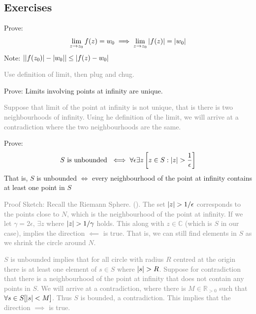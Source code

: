 \documentclass[12pt, english]{book}
\makeatletter
\renewenvironment{proof}[1][\proofname]{\par
	\pushQED{\qed}%
	\normalfont \topsep6\p@\@plus6\p@\relax
	\list{}{%
		\settowidth{\leftmargin}{\itshape\proofname:\hskip\labelsep}%
		\setlength{\labelwidth}{0pt}%
		\setlength{\itemindent}{-\leftmargin}%
		}%
	\item[\hskip\labelsep\itshape#1\@addpunct{:}]\ignorespaces
	}{\popQED\endlist\@endpefalse}
\makeatother
\begin{document}
	\subsection{Exercises}
	
	\begin{example}
		Prove: $$ \lim_{z \rightarrow z_0} f(z) = w_0 \implies \lim_{z \rightarrow z_0} \abs{f(z)} = \abs{w_0}$$
		Note: $\abs{\abs{f(z_0)} - \abs{w_0}} \leq \abs{f(z) - w_0}$
	\end{example}
	\begin{proof}
		\textcolor{Grey}{Use definition of limit, then plug and chug.}
	\end{proof}
	
	\begin{example}
		Prove: Limits involving points at infinity are unique.
	\end{example}
	\begin{proof}
		\textcolor{Grey}{
		Suppose that limit of the point at infinity is not unique, that is there is two neighbourhoods of infinity. Using he definition of the limit, we will arrive at a contradiction where the two neighbourhoods are the same. 
		}
	\end{proof}
	
	\begin{example}
		Prove:
		\begin{align*}
			S \text{ is unbounded } \iff \forall \epsilon \exists z \left[ z \in S : \abs{z} > \frac{1}{\epsilon} \right]
		\end{align*}
		That is, $S$ is unbounded $\iff$ every neighbourhood of the point at infinity contains at least one point in $S$
	\end{example}
	\begin{proof}
		\textcolor{Grey}{
		Proof Sketch: 
		Recall the Riemann Sphere. (). The set $\abs{z} > 1/\epsilon$ corresponds to the points close to $N$, which is the neighbourhood of the point at infinity. If we let $\gamma = 2\epsilon$, $\exists z$ where $\abs{z} > 1/\gamma$ holds. This along with $z \in \mathbb{C}$ (which is $S$ in our case), implies the direction $\impliedby$ is true. That is, we can still find elements in $S$ as we shrink the circle around $N$. 
		}
		
		\textcolor{Grey}{
		$S$ is unbounded implies that for all circle with radius $R$ centred at the origin there is at least one element of $s \in S$ where $\abs{s} > R$. Suppose for contradiction that there is a neighbourhood of the point at infinity that does not contain any points in $S$. We will arrive at a contradiction, where there is $M \in \mathbb{R}_{>0}$ such that $\forall s \in S [\abs{s} < M]$. Thus $S$ is bounded, a contradiction. This implies that the direction $\implies$ is true. 
		}
	\end{proof}
\end{document}
